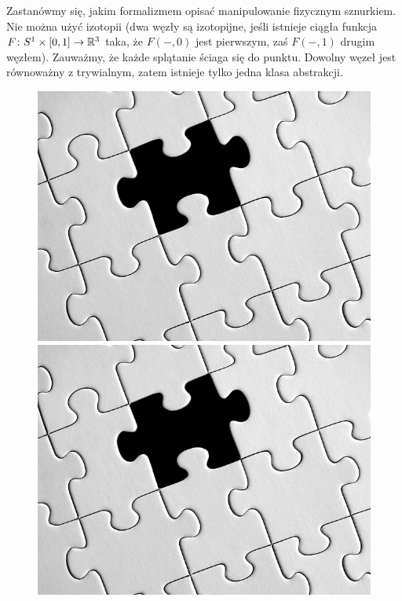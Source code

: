 Zastanówmy się, jakim formalizmem opisać manipulowanie fizycznym sznurkiem.
Nie można użyć izotopii
(dwa węzły są izotopijne, jeśli istnieje ciągła funkcja $F \colon S^1 \times [0, 1] \to \mathbb R^3$ taka, że $F(-, 0)$ jest pierwszym, zaś $F(-,1)$ drugim węzłem).
Zauważmy, że każde splątanie ściaga się do punktu.
Dowolny węzeł jest równoważny z trywialnym, zatem istnieje tylko jedna klasa abstrakcji.
\begin{figure}[H]
	\begin{minipage}[b]{.23\linewidth}
		\centering
		\includegraphics[width=\linewidth]{../data/missing.jpg}
	\end{minipage}
	\begin{minipage}[b]{.23\linewidth}
		\centering
		\includegraphics[width=\linewidth]{../data/missing.jpg}

\end{minipage}
\end{figure}
